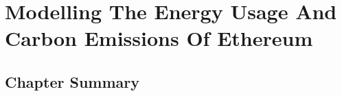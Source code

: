 \chapter{Modelling The Energy Usage And Carbon Emissions Of Ethereum}
\label{Modelling}

\section{Chapter Summary}






    
    
    
    
    
